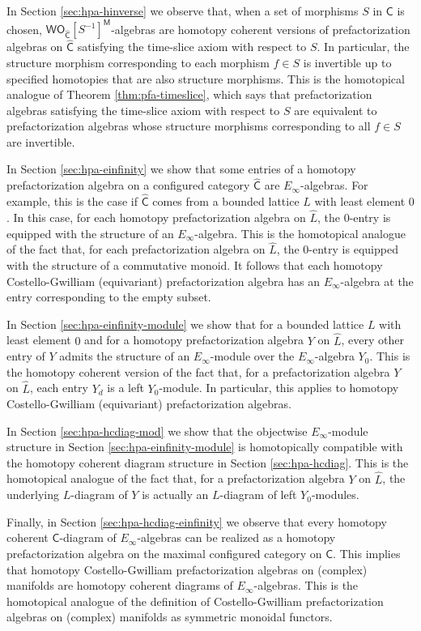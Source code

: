 \documentclass[11pt]{amsbook}
\numberwithin{section}{chapter}
\numberwithin{subsection}{section}
\numberwithin{equation}{section}
\theoremstyle{plain}
\theoremstyle{definition}
\newcommand{\C}{\mathsf{C}}
\newcommand{\M}{\mathsf{M}}
\renewcommand{\O}{\mathsf{O}}
\newcommand{\W}{\mathsf{W}}
\newcommand{\inv}[1]{{#1}^{-1}}
\newcommand{\Sinv}{\inv{S}}
\newcommand{\Chat}{\widehat{\C}}
\newcommand{\Lhat}{\widehat{L}}
\newcommand{\Ochat}{\O_{\Chat}}
\newcommand{\wochat}{\W\Ochat}
\newcommand{\wochatsinv}{\wochat[\Sinv]}
\newcommand{\wochatsinvm}{\wochatsinv^{\M}}
\begin{document}
In Section \ref{sec:hpa-hinverse} we observe that, when a set of morphisms $S$ in $\C$ is chosen, $\wochatsinvm$-algebras are homotopy coherent versions of prefactorization algebras on $\Chat$ satisfying the time-slice axiom with respect to $S$.  In particular, the structure morphism corresponding to each morphism $f \in S$ is invertible up to specified homotopies that are also structure morphisms.  This is the homotopical analogue of Theorem \ref{thm:pfa-timeslice}, which says that prefactorization algebras satisfying the time-slice axiom with respect to $S$ are equivalent to prefactorization algebras whose structure morphisms corresponding to all $f \in S$ are invertible.

In Section \ref{sec:hpa-einfinity} we show that some entries of a homotopy prefactorization algebra on a configured category $\Chat$ are $E_\infty$-algebras.  For example, this is the case if $\Chat$ comes from a bounded lattice $L$ with least element $0$.  In this case, for each homotopy prefactorization algebra on $\Lhat$, the $0$-entry is equipped with the structure of an $E_\infty$-algebra.  This is the homotopical analogue of the fact that, for each prefactorization algebra on $\Lhat$, the $0$-entry is equipped with the structure of a commutative monoid.  It follows that each homotopy Costello-Gwilliam (equivariant) prefactorization algebra has an $E_\infty$-algebra at the entry corresponding to the empty subset.

In Section \ref{sec:hpa-einfinity-module} we show that for a bounded lattice $L$ with least element $0$ and for a homotopy prefactorization algebra $Y$ on $\Lhat$, every other entry of $Y$ admits the structure of an $E_\infty$-module over the $E_\infty$-algebra $Y_0$.  This is the homotopy coherent version of the fact that, for a prefactorization algebra $Y$ on $\Lhat$, each entry $Y_d$ is a left $Y_0$-module.  In particular, this applies to homotopy Costello-Gwilliam (equivariant) prefactorization algebras.  

In Section \ref{sec:hpa-hcdiag-mod} we show that the objectwise $E_\infty$-module structure in Section \ref{sec:hpa-einfinity-module} is homotopically compatible with the homotopy coherent diagram structure in Section \ref{sec:hpa-hcdiag}.  This is the homotopical analogue of the fact that, for a prefactorization algebra $Y$ on $\Lhat$, the underlying $L$-diagram of $Y$ is actually an $L$-diagram of left $Y_0$-modules.

Finally, in Section \ref{sec:hpa-hcdiag-einfinity} we observe that every homotopy coherent $\C$-diagram of $E_\infty$-algebras can be realized as a homotopy prefactorization algebra on the maximal configured category on $\C$.  This implies that homotopy Costello-Gwilliam prefactorization algebras on (complex) manifolds are homotopy coherent diagrams of $E_\infty$-algebras.  This is the homotopical analogue of the definition of Costello-Gwilliam prefactorization algebras on (complex) manifolds as symmetric monoidal functors.
\end{document}

